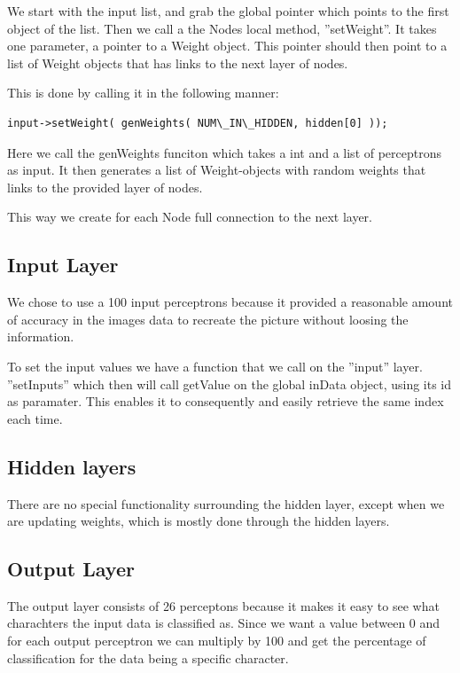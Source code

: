 We start with the input list, and grab the global pointer which points to the
first object of the list.  Then we call a the Nodes local method, ''setWeight''.
It takes one parameter, a pointer to a Weight object.  This pointer should then
point to a list of Weight objects that has links to the next layer of nodes.

This is done by calling it in the following manner:
\begin{verbatim}
input->setWeight( genWeights( NUM\_IN\_HIDDEN, hidden[0] ));
\end{verbatim}

Here we call the genWeights funciton which takes a int and a list of
\gls{perceptron}s
as input. It then generates a list of Weight-objects with random weights that
links to the provided layer of nodes.

This way we create for each Node full connection to the next layer.


\subsection{Input Layer}
We chose to use a 100 input \gls{perceptron}s because it provided a reasonable amount
of accuracy in the images data to recreate the picture without loosing the
information.

To set the input values we have a function that we call on the ''input'' layer.
''setInputs'' which then will call getValue on the global inData object, using
its id as paramater. This enables it to consequently and easily retrieve the
same index each time.

\subsection{Hidden layers}
There are no special functionality surrounding the hidden layer, except when we
are updating weights, which is mostly done through the hidden layers.

\subsection{Output Layer}
The output layer consists of 26 perceptons because it makes it easy to see what
charachters the input data is classified as.  Since we want a value between 0
and for each output perceptron we can multiply by 100 and get the percentage of
classification for the data being a specific character.

